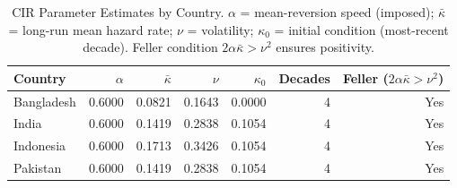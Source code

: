 \begin{table}
\caption{CIR Parameter Estimates by Country. $\alpha$ = mean-reversion speed (imposed); $\bar{\kappa}$ = long-run mean hazard rate; $\nu$ = volatility; $\kappa_0$ = initial condition (most-recent decade). Feller condition $2\alpha\bar{\kappa}>\nu^2$ ensures positivity.}
\label{tab:cir_params}
\begin{tabular}{lrrrrrr}
\toprule
Country & $\alpha$ & $\bar{\kappa}$ & $\nu$ & $\kappa_0$ & Decades & Feller ($2\alpha\bar{\kappa}>\nu^2$) \\
\midrule
Bangladesh & 0.6000 & 0.0821 & 0.1643 & 0.0000 & 4 & Yes \\
India & 0.6000 & 0.1419 & 0.2838 & 0.1054 & 4 & Yes \\
Indonesia & 0.6000 & 0.1713 & 0.3426 & 0.1054 & 4 & Yes \\
Pakistan & 0.6000 & 0.1419 & 0.2838 & 0.1054 & 4 & Yes \\
\bottomrule
\end{tabular}
\end{table}
